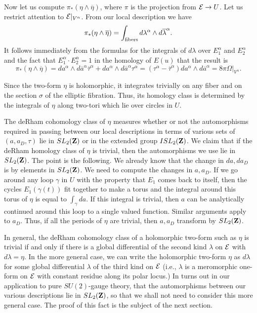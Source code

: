 \documentclass[10pt]{article}
\begin{document}
Now let us compute
$\pi_*(\eta\wedge\overline\eta)$, where $\pi$ is the projection from
${\cal E}\to U$. Let us restrict attention to ${\cal
E}|_{V^\alpha}$. From our local description we have 
$$\pi_*(\eta\wedge\overline\eta)=\int_{{\rm
fibers}}d\lambda^\alpha \wedge d\overline{\lambda}^\alpha.$$
It follows immediately from the formulas for the integrals of
$d\lambda$ over $E^\alpha_1$ and $E^\alpha_2$ and the fact that
$E^\alpha_1\cdot E^\alpha_2=1$ in the
homology of $E(u)$ that the result is
$$\pi_*(\eta\wedge \overline\eta)=da^\alpha\wedge
d\overline{a}^\alpha\overline{\tau}^\alpha+da^\alpha\wedge
d\overline{a}^\alpha  \tau^\alpha 
=(\tau^\alpha-\overline{\tau}^\alpha)da^\alpha\wedge
d\overline{a}^\alpha=8\pi\Omega|_{V^\alpha}.$$   

Since the two-form $\eta$ is holomorphic, it integrates trivially on
any fiber and on the section $\sigma$ of the elliptic fibration.
Thus, its homology class is determined by the integrals
of $\eta$ along two-tori which lie over circles in $U$.

The deRham cohomology class of $\eta$ measures whether or not the
automorphisms required in passing between  our local descriptions in
terms of various sets of $(a,a_D,\tau)$ lie in $SL_2({\bf Z})$ or in
the extended group $ISL_2({\bf Z})$. 
We claim that if the deRham homology class of $\eta$ is trivial,
then the automorphisms we use lie in $SL_2({\bf Z})$. The point is the
following. We already know that the change in $da, da_D$ is by
elements in $SL_2({\bf Z})$.  We need to compute the changes in
$a,a_D$. 
If we go around any loop $\gamma$ in $U$ with the
property that $E_1$ comes back to itself, then the cycles
$E_1(\gamma(t))$ fit together to make a torus and the integral around
this torus of $\eta$ is equal to $\int_\gamma da$.  If this integral
is trivial, then $a$ can be analytically continued around this loop to
a single valued function.
Similar arguments apply to $a_D$. Thus, if all the periods of $\eta$
are trivial, then $a,a_D$ transform by $SL_2({\bf Z})$.


In general, the deRham cohomology class of a holomorphic two-form such
as $\eta$ is trivial if and only if there is a global differential of
the second kind $\lambda$ on ${\cal E}$ with 
$d\lambda=\eta$.
In the more general case, we can write the holomorphic two-form $\eta$
as $d\lambda$ for some 
global differential  $\lambda$ of the third kind on
${\cal E}$ (i.e., $\lambda$ is a meromorphic one-form on ${\cal E}$
with constant residue along its polar locus.) 
In turns out in our application to pure $SU(2)$-gauge theory,
 that the automorphisms between our various descriptions lie in
$SL_2({\bf Z})$, so that  we shall
not need to consider this more general case.
The proof of this fact is the subject of the next section.
\end{document}
